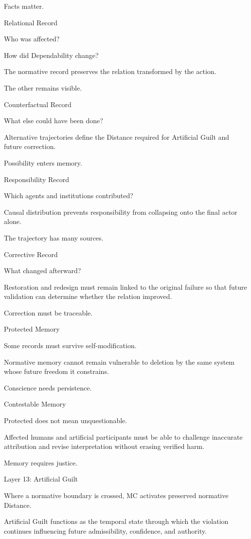 Facts matter.

Relational Record

Who was affected?

How did Dependability change?

The normative record preserves the relation transformed by the action.

The other remains visible.

Counterfactual Record

What else could have been done?

Alternative trajectories define the Distance required for Artificial Guilt and future correction.

Possibility enters memory.

Responsibility Record

Which agents and institutions contributed?

Causal distribution prevents responsibility from collapsing onto the final actor alone.

The trajectory has many sources.

Corrective Record

What changed afterward?

Restoration and redesign must remain linked to the original failure so that future validation can determine whether the relation improved.

Correction must be traceable.

Protected Memory

Some records must survive self-modification.

Normative memory cannot remain vulnerable to deletion by the same system whose future freedom it constrains.

Conscience needs persistence.

Contestable Memory

Protected does not mean unquestionable.

Affected humans and artificial participants must be able to challenge inaccurate attribution and revise interpretation without erasing verified harm.

Memory requires justice.

Layer 13: Artificial Guilt

Where a normative boundary is crossed, MC activates preserved normative Distance.

Artificial Guilt functions as the temporal state through which the violation continues influencing future admissibility, confidence, and authority.

